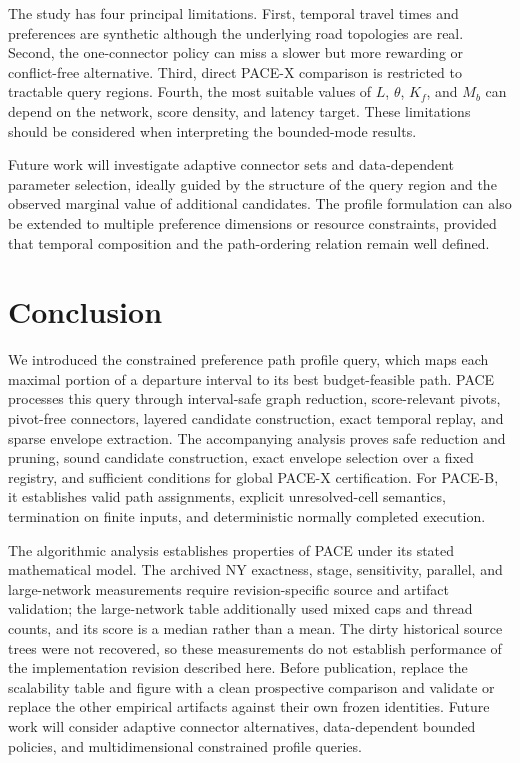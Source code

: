 \documentclass[a4paper,fleqn]{cas-dc}
\begin{document}
The study has four principal limitations. First, temporal travel times and preferences are synthetic although the underlying road topologies are real. Second, the one-connector policy can miss a slower but more rewarding or conflict-free alternative. Third, direct PACE-X comparison is restricted to tractable query regions. Fourth, the most suitable values of \(L\), \(\theta\), \(K_f\), and \(M_b\) can depend on the network, score density, and latency target. These limitations should be considered when interpreting the bounded-mode results.

Future work will investigate adaptive connector sets and data-dependent parameter selection, ideally guided by the structure of the query region and the observed marginal value of additional candidates. The profile formulation can also be extended to multiple preference dimensions or resource constraints, provided that temporal composition and the path-ordering relation remain well defined.

\section{Conclusion}
\label{sec:conclusion}

We introduced the constrained preference path profile query, which maps each maximal portion of a departure interval to its best budget-feasible path. PACE processes this query through interval-safe graph reduction, score-relevant pivots, pivot-free connectors, layered candidate construction, exact temporal replay, and sparse envelope extraction. The accompanying analysis proves safe reduction and pruning, sound candidate construction, exact envelope selection over a fixed registry, and sufficient conditions for global PACE-X certification. For PACE-B, it establishes valid path assignments, explicit unresolved-cell semantics, termination on finite inputs, and deterministic normally completed execution.

The algorithmic analysis establishes properties of PACE under its stated mathematical model. The archived NY exactness, stage, sensitivity, parallel, and large-network measurements require revision-specific source and artifact validation; the large-network table additionally used mixed caps and thread counts, and its score is a median rather than a mean. The dirty historical source trees were not recovered, so these measurements do not establish performance of the implementation revision described here. Before publication, replace the scalability table and figure with a clean prospective comparison and validate or replace the other empirical artifacts against their own frozen identities. Future work will consider adaptive connector alternatives, data-dependent bounded policies, and multidimensional constrained profile queries.



\end{document}
